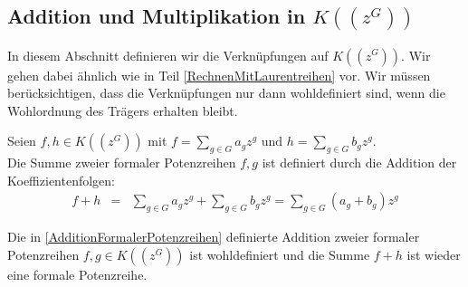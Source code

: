 \subsection{Addition und Multiplikation in $K((z^{G}))$}
%
%
%
%
%
%
In diesem Abschnitt definieren wir die Verknüpfungen auf $K((z^{G}))$. Wir gehen dabei ähnlich wie in Teil \ref{RechnenMitLaurentreihen} vor. Wir müssen berücksichtigen, dass die Verknüpfungen nur dann wohldefiniert sind, wenn die Wohlordnung des Trägers erhalten bleibt.
%
%
%
%
%
%
%
%
%
\begin{defn}\label{AdditionFormalerPotenzreihen}
Seien $f, h \in K\left(\left(z^G\right)\right)$ mit $f = \sum_{g \in G}^{} a_g z^g \text{ und } h = \sum_{g \in G}^{} b_g z^g$.\\
Die Summe zweier formaler Potenzreihen $f, g$ ist definiert durch die Addition der Koeffizientenfolgen:
\begin{eqnarray*}
f + h &=& \sum_{g \in G}^{} a_g z^g + \sum_{g \in G}^{} b_g z^g
= \sum_{g \in G}^{}\left(a_g + b_g\right)z^g 
\end{eqnarray*}
\end{defn}
%
%
%
%
%
\begin{satz}\label{wohldefiniertheitAddition}
Die in \ref{AdditionFormalerPotenzreihen} definierte Addition zweier formaler Potenzreihen $f, g \in K\left(\left(z^{G}\right)\right)$ ist wohldefiniert und die Summe $f +h$ ist wieder eine formale Potenzreihe.
\end{satz}
